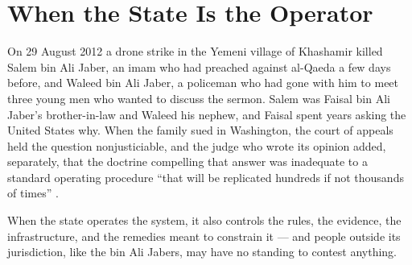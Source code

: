 \chapter{When the State Is the Operator}
\label{sec:15}
On 29 August 2012 a drone strike in the Yemeni village of Khashamir killed Salem bin Ali Jaber, an imam who had preached against al-Qaeda a few days before, and Waleed bin Ali Jaber, a policeman who had gone with him to meet three young men who wanted to discuss the sermon. Salem was Faisal bin Ali Jaber's brother-in-law and Waleed his nephew, and Faisal spent years asking the United States why. When the family sued in Washington, the court of appeals held the question nonjusticiable, and the judge who wrote its opinion added, separately, that the doctrine compelling that answer was inadequate to a standard operating procedure “that will be replicated hundreds if not thousands of times” \autocite{binalijaber2017}.

When the state operates the system, it also controls the rules, the evidence, the infrastructure, and the remedies meant to constrain it — and people outside its jurisdiction, like the bin Ali Jabers, may have no standing to contest anything.
